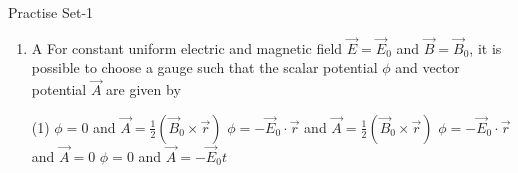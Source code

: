 






















\newpage
\begin{abox}
	Practise Set-1
\end{abox}
\begin{enumerate}
	\item  A For constant uniform electric and magnetic field $\vec{E}=\vec{E}_{0}$ and $\vec{B}=\vec{B}_{0}$, it is possible to choose a gauge such that the scalar potential $\phi$ and vector potential $\vec{A}$ are given by
	{}
	\begin{tasks}(1)
		\task[\textbf{A.}] $\phi=0$ and $\vec{A}=\frac{1}{2}\left(\vec{B}_{0} \times \vec{r}\right)$
		\task[\textbf{B.}] $\phi=-\vec{E}_{0} \cdot \vec{r}$ and $\vec{A}=\frac{1}{2}\left(\vec{B}_{0} \times \vec{r}\right)$
		\task[\textbf{C.}]  $\phi=-\vec{E}_{0} \cdot \vec{r}$ and $\vec{A}=0$
		\task[\textbf{D.}] $\phi=0$ and $\vec{A}=-\vec{E}_{0} t$
	\end{tasks}
	

\end{enumerate}

